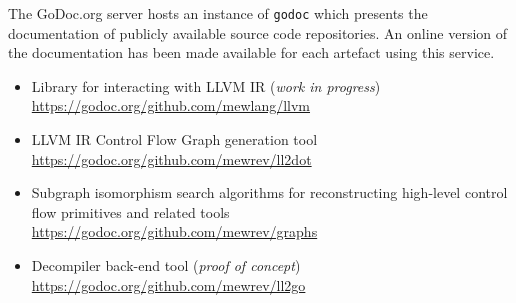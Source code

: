 The GoDoc.org server hosts an instance of \texttt{godoc} which presents the documentation of publicly available source code repositories. An online version of the documentation has been made available for each artefact using this service.

\begin{itemize}
	\item Library for interacting with LLVM IR (\textit{work in progress}) \\ \url{https://godoc.org/github.com/mewlang/llvm}
	\item LLVM IR Control Flow Graph generation tool \\ \url{https://godoc.org/github.com/mewrev/ll2dot}
	\item Subgraph isomorphism search algorithms for reconstructing high-level control flow primitives and related tools \\ \url{https://godoc.org/github.com/mewrev/graphs}
	\item Decompiler back-end tool (\textit{proof of concept}) \\ \url{https://godoc.org/github.com/mewrev/ll2go}
\end{itemize}
